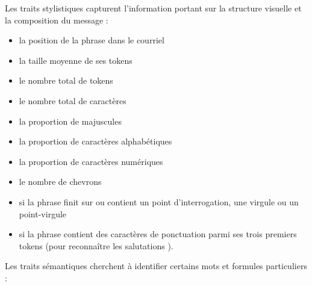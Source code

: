Les traits stylistiques capturent l'information portant sur la structure visuelle et la composition du message : 

\begin{itemize}
	\item[\bullet] la position de la phrase dans le courriel
	\item[\bullet] la taille moyenne de ses tokens
	\item[\bullet] le nombre total de tokens 
	\item[\bullet] le nombre total de caractères
	\item[\bullet] la proportion de majuscules
	\item[\bullet] la proportion de caractères alphabétiques
	\item[\bullet] la proportion de caractères numériques
	\item[\bullet] le nombre de chevrons
	\item[\bullet] si la phrase finit sur ou contient un point d'interrogation, une virgule ou un point-virgule
	\item[\bullet] si la phrase contient des caractères de ponctuation parmi ses trois premiers tokens (pour reconnaître les salutations \cite{qadir2011classifying}).
\end{itemize}

Les traits sémantiques cherchent à identifier certains mots et formules particuliers : 


